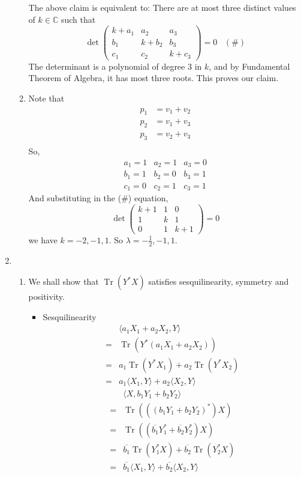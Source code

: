 \documentclass[12pt]{article}
\DeclareMathOperator{\Tr}{Tr}
\newcommand{\str}{^\ast}
\theoremstyle{definition}
\begin{document}
\begin{enumerate}
\begin{enumerate}
  The above claim is equivalent to: There are at most three distinct values of $k\in\mathbb{C}$ such that
  \[
  \det\left(\begin{matrix}k+a_1&a_2&a_3 \\ b_1&k+b_2&b_3 \\ c_1&c_2&k+c_3\end{matrix}\right) = 0\;\;\;(\#)
  \]
  The determinant is a polynomial of degree $3$ in $k$, and by Fundamental Theorem of Algebra, it has most three roots. This proves our claim.
  \item Note that 
  \begin{align*}
  p_1&=v_1+v_2\\
  p_2&=v_1+v_3\\
  p_3&=v_2+v_3\\
  \end{align*}
  So,\[
  \begin{array}{ccc}
  a_1=1&a_2 = 1&a_3=0\\
  b_1=1&b_2=0&b_3=1\\
  c_1=0&c_2=1&c_3=1
\end{array}
  \]
  And substituting in the (\#) equation,
  \[
\det\left(\begin{matrix}k+1&1&0 \\ 1&k&1 \\ 0&1&k+1\end{matrix}\right)=0
  \]
  we have $k=-2,-1,1$. So $\lambda = -\frac{1}{2},-1,1$.
  \end{enumerate}
  \item\begin{enumerate}\item
  We shall show that $\Tr(Y^\ast X)$ satisfies sesquilinearity, symmetry and positivity.\\
  \begin{itemize} 
    \item Sesquilinearity \hfill
    \begin{align*}
&\langle a_1X_1+a_2X_2,Y\rangle\\ =&\Tr(Y^\ast (a_1X_1+a_2X_2))\\=&a_1\Tr(Y^\ast X_1)+a_2\Tr(Y^\ast X_2)\\=&a_1\langle X_1,Y\rangle + a_2\langle X_2,Y\rangle
    \end{align*}
     \begin{align*}
&\langle X,b_1Y_1+b_2Y_2\rangle\\ =&\Tr(((b_1Y_1+b_2Y_2)^\ast)X)\\=&\Tr((\overline{b_1}Y_1\str +\overline{b_2}Y_2\str)X) \\=&\overline{b_1}\Tr(Y_1^\ast X)+\overline{b_2}\Tr(Y_2^\ast X)\\=&\overline{b_1}\langle X_1,Y\rangle + \overline{b_2}\langle X_2,Y\rangle

\end{align*}
\end{itemize}
\end{enumerate}
\end{enumerate}
\end{document}
